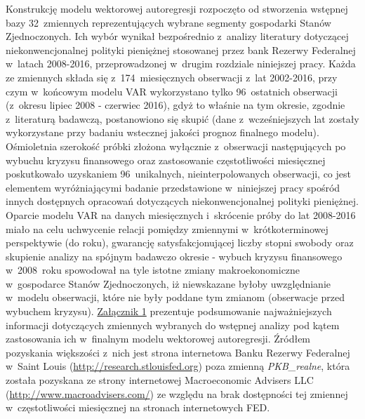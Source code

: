 Konstrukcję modelu wektorowej autoregresji rozpoczęto od stworzenia wstępnej bazy 32~zmiennych reprezentujących wybrane segmenty gospodarki Stanów Zjednoczonych. Ich wybór wynikał bezpośrednio z~analizy literatury dotyczącej niekonwencjonalnej polityki pieniężnej stosowanej przez bank Rezerwy Federalnej w~latach 2008-2016, przeprowadzonej w~drugim rozdziale niniejszej pracy. Każda ze zmiennych składa się z~174~miesięcznych obserwacji z~lat 2002-2016, przy czym w~końcowym modelu \acs{VAR} wykorzystano tylko 96~ostatnich obserwacji (z~okresu lipiec 2008 - czerwiec 2016), gdyż to właśnie na tym okresie, zgodnie z~literaturą badawczą, postanowiono się skupić (dane z~wcześniejszych lat zostały wykorzystane przy badaniu wstecznej jakości prognoz finalnego modelu). Ośmioletnia szerokość próbki złożona wyłącznie z~obserwacji następujących po wybuchu kryzysu finansowego oraz zastosowanie częstotliwości miesięcznej poskutkowało uzyskaniem 96~unikalnych, nieinterpolowanych obserwacji, co jest elementem wyróżniającymi badanie przedstawione w~niniejszej pracy spośród innych dostępnych opracowań dotyczących niekonwencjonalnej polityki pieniężnej. Oparcie modelu \acs{VAR} na danych miesięcznych i~skrócenie próby do lat 2008-2016 miało na celu uchwycenie relacji pomiędzy zmiennymi w~krótkoterminowej perspektywie (do roku), gwarancję satysfakcjonującej liczby stopni swobody oraz skupienie analizy na spójnym badawczo okresie - wybuch kryzysu finansowego w~2008~roku spowodował na tyle istotne zmiany makroekonomiczne w~gospodarce Stanów Zjednoczonych, iż niewskazane byłoby uwzględnianie w~modelu obserwacji, które nie były poddane tym zmianom (obserwacje przed wybuchem kryzysu). \hyperlink{zal1}{Załącznik 1} prezentuje podsumowanie najważniejszych informacji dotyczących zmiennych wybranych do wstępnej analizy pod kątem zastosowania ich w~finalnym modelu wektorowej autoregresji. Źródłem pozyskania większości z~nich jest strona internetowa Banku Rezerwy Federalnej w~Saint Louis (\url{http://research.stlouisfed.org}) poza zmienną \textit{PKB_realne}, która została pozyskana ze strony internetowej Macroeconomic Advisers LLC (\url{http://www.macroadvisers.com/}) ze względu na brak dostępności tej zmiennej w~częstotliwości miesięcznej na stronach internetowych FED.


